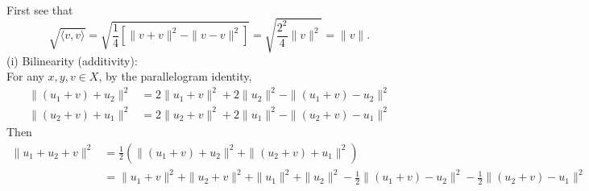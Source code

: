 \begin{enumerate}
    \\First see that
    \[
        \sqrt{\langle v,v \rangle} = \sqrt{\frac{1}{4}[\|v+v\|^2-\|v-v\|^2]}=\sqrt{\frac{2^2}{4}\|v\|^2}=\|v\|.\tag{1}
    \]
    (i) Bilinearity (additivity):
    \\For any $x,y,v\in X$, by the parallelogram identity,
    \begin{align*}
        \|(u_1+v)+u_2\|^2&=2\|u_1+v\|^2+2\|u_2\|^2-\|(u_1+v)-u_2\|^2\\
        \|(u_2+v)+u_1\|^2&=2\|u_2+v\|^2+2\|u_1\|^2-\|(u_2+v)-u_1\|^2
    \end{align*}
    Then
    \begin{align*}
        \|u_1+u_2+v\|^2&=\frac{1}{2}(\|(u_1+v)+u_2\|^2+\|(u_2+v)+u_1\|^2)\\
        &=\|u_1+v\|^2+\|u_2+v\|^2+\|u_1\|^2+\|u_2\|^2-\frac{1}{2}\|(u_1+v)-u_2\|^2-\frac{1}{2}\|(u_2+v)-u_1\|^2

\end{align*}
\end{enumerate}
